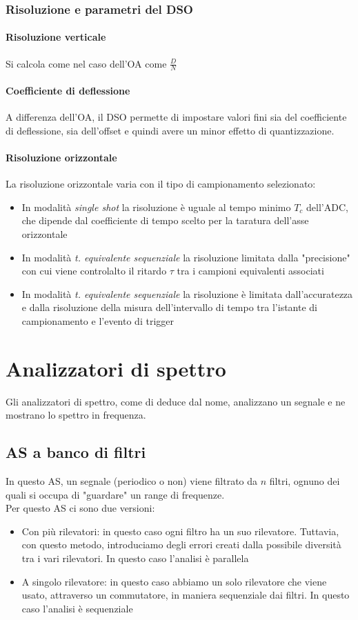 \documentclass{article}
\begin{document}
	\subsubsection*{Risoluzione e parametri del DSO}
	\paragraph*{Risoluzione verticale}
	Si calcola come nel caso dell'OA come $\frac{D}{N}$
	\paragraph*{Coefficiente di deflessione}
	A differenza dell'OA, il DSO permette di impostare valori fini sia del coefficiente di deflessione, sia dell'offset e quindi avere un minor effetto di quantizzazione.
	\paragraph*{Risoluzione orizzontale}
	La risoluzione orizzontale varia con il tipo di campionamento selezionato:
	\begin{itemize}
		\item In modalità \textit{single shot} la risoluzione è uguale al tempo minimo $T_c$ dell'ADC, che dipende dal coefficiente di tempo scelto per la taratura dell'asse orizzontale
		\item In modalità \textit{t. equivalente sequenziale} la risoluzione limitata dalla "precisione" con cui viene controlalto il ritardo $\tau$ tra i campioni equivalenti associati
		\item In modalità \textit{t. equivalente sequenziale} la risoluzione è limitata dall'accuratezza e dalla risoluzione della misura dell'intervallo di tempo tra l'istante di campionamento e l'evento di trigger
	\end{itemize}

	\newpage
	\section*{Analizzatori di spettro}
	Gli analizzatori di spettro, come di deduce dal nome, analizzano un segnale e ne mostrano lo spettro in frequenza.
	\subsection*{AS a banco di filtri}
	In questo AS, un segnale (periodico o non) viene filtrato da $n$ filtri, ognuno dei quali si occupa di "guardare" un range di frequenze.\\
	Per questo AS ci sono due versioni:
	\begin{itemize}
		\item Con più rilevatori: in questo caso ogni filtro ha un suo rilevatore. Tuttavia, con questo metodo, introduciamo degli errori creati dalla possibile diversità tra i vari rilevatori. In questo caso l'analisi è parallela
		\item A singolo rilevatore: in questo caso abbiamo un solo rilevatore che viene usato, attraverso un commutatore, in maniera sequenziale dai filtri. In questo caso l'analisi è sequenziale
	\end{itemize}
\end{document}
